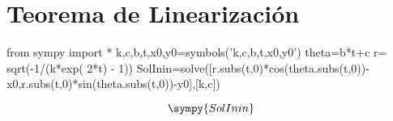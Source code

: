 

 \chapter{Teorema de Linearización}
\begin{sympyblock}
from sympy import *
k,c,b,t,x0,y0=symbols('k,c,b,t,x0,y0')
theta=b*t+c
r= sqrt(-1/(k*exp( 2*t) - 1))
SolInin=solve([r.subs(t,0)*cos(theta.subs(t,0))-x0,r.subs(t,0)*sin(theta.subs(t,0))-y0],[k,c])
\end{sympyblock}

\[\sympy{SolInin}\]



